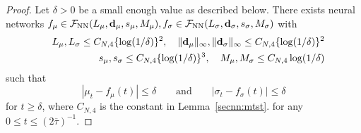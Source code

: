\documentclass[twoside,11pt]{article}
\def\cF{\mathcal F}
\newcommand{\bd}{{\bf d}}
\newcommand{\be}{\begin{equation}}
\newcommand{\ee}{\end{equation}}
\newcommand{\bean}{\setlength\arraycolsep{1pt}\begin{eqnarray*}}
\newcommand{\eean}{\end{eqnarray*}}
\begin{document}
\begin{proof}
Let $\delta > 0$ be a small enough value as described below.
There exists neural networks  $f_{\mu} \in \cF_{\rm NN}(L_{\mu},\bd_{\mu},s_{\mu},M_{\mu}), f_{\sigma} \in \cF_{\rm NN}(L_{\sigma},\bd_{\sigma},s_{\sigma},M_{\sigma})$ with
\bean
&& L_{\mu}, L_{\sigma} \leq C_{N,4} \{ \log(1/\delta)\}^{2}, \quad \|\bd_{\mu} \|_{\infty},  \| \bd_{\sigma}\|_{\infty} \leq C_{N,4}  \{ \log(1/\delta)\}^{2}
\\
&& s_{\mu}, s_{\sigma} \leq C_{N,4}  \{ \log(1/\delta)\}^{3}, \quad M_{\mu}, M_{\sigma} \leq C_{N,4} \log ( 1/\delta)
\eean
such that
\be
\left\vert \mu_{t} - f_{\mu}(t) \right\vert \leq \delta \quad \quad \text{and} \quad \quad \left\vert \sigma_{t} - f_{\sigma}(t) \right\vert \leq \delta \label{eqthm1:nnmtst}
\ee
for $ t \geq \delta$, where $C_{N,4}$ is the constant in Lemma~\ref{secnn:mtst}.
for any $0 \leq t \leq (2\overline{\tau})^{-1}$.


\end{proof}
\end{document}
